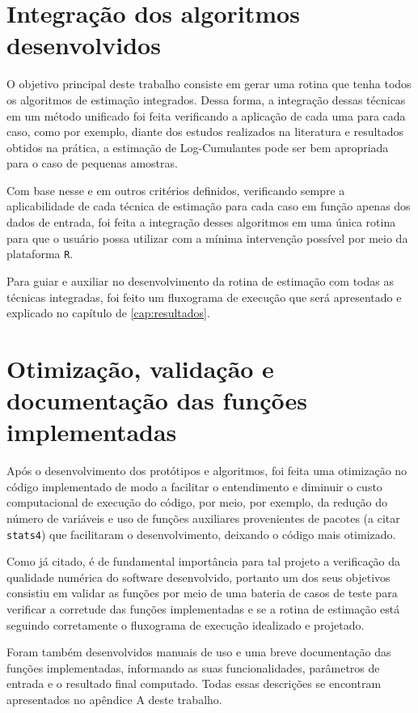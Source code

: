 \section{Integração dos algoritmos desenvolvidos}

O objetivo principal deste trabalho consiste em gerar uma rotina que tenha todos os algoritmos de estimação integrados. Dessa forma, a integração dessas técnicas em um método unificado foi feita verificando a aplicação de cada uma para cada caso, como por exemplo, diante dos estudos realizados na literatura e resultados obtidos na prática, a estimação de Log-Cumulantes pode ser bem apropriada para o caso de pequenas amostras.

Com base nesse e em outros critérios definidos, verificando sempre a aplicabilidade de cada técnica de estimação para cada caso em função apenas dos dados de entrada, foi feita a integração desses algoritmos em uma única rotina para que o usuário possa utilizar com a mínima intervenção possível por meio da plataforma \texttt{R}.

Para guiar e auxiliar no desenvolvimento da rotina de estimação com todas as técnicas integradas, foi feito um fluxograma de execução que será apresentado e explicado no capítulo de \ref{cap:resultados}.


\section{Otimização, validação e documentação das funções implementadas}

Após o desenvolvimento dos protótipos e algoritmos, foi feita uma otimização no código implementado de modo a facilitar o entendimento e diminuir o custo computacional de execução do código, por meio, por exemplo, da redução do número de variáveis e uso de funções auxiliares provenientes de pacotes (a citar \texttt{stats4}) que facilitaram o desenvolvimento, deixando o código mais otimizado.

Como já citado, é de fundamental importância para tal projeto a verificação da qualidade numérica do software desenvolvido, portanto um dos seus objetivos consistiu em validar as funções por meio de uma bateria de casos de teste para verificar a corretude das funções implementadas e se a rotina de estimação está seguindo corretamente o fluxograma de execução idealizado e projetado.

Foram também desenvolvidos manuais de uso e uma breve documentação das funções implementadas, informando as suas funcionalidades, parâmetros de entrada e o resultado final computado. Todas essas descrições se encontram apresentados no apêndice A deste trabalho.

